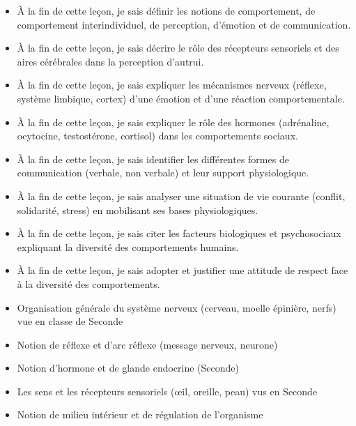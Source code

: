 \documentclass[11pt]{article}
\begin{document}
\begin{objectifs}
\begin{itemize}
\item À la fin de cette leçon, je sais définir les notions de comportement, de comportement interindividuel, de perception, d'émotion et de communication.
\item À la fin de cette leçon, je sais décrire le rôle des récepteurs sensoriels et des aires cérébrales dans la perception d'autrui.
\item À la fin de cette leçon, je sais expliquer les mécanismes nerveux (réflexe, système limbique, cortex) d'une émotion et d'une réaction comportementale.
\item À la fin de cette leçon, je sais expliquer le rôle des hormones (adrénaline, ocytocine, testostérone, cortisol) dans les comportements sociaux.
\item À la fin de cette leçon, je sais identifier les différentes formes de communication (verbale, non verbale) et leur support physiologique.
\item À la fin de cette leçon, je sais analyser une situation de vie courante (conflit, solidarité, stress) en mobilisant ses bases physiologiques.
\item À la fin de cette leçon, je sais citer les facteurs biologiques et psychosociaux expliquant la diversité des comportements humains.
\item À la fin de cette leçon, je sais adopter et justifier une attitude de respect face à la diversité des comportements.
\end{itemize}
\end{objectifs}

\begin{prerequis}
\begin{itemize}
\item Organisation générale du système nerveux (cerveau, moelle épinière, nerfs) vue en classe de Seconde
\item Notion de réflexe et d'arc réflexe (message nerveux, neurone)
\item Notion d'hormone et de glande endocrine (Seconde)
\item Les sens et les récepteurs sensoriels (œil, oreille, peau) vus en Seconde
\item Notion de milieu intérieur et de régulation de l'organisme
\end{itemize}
\end{prerequis}

\newpage
\end{document}
